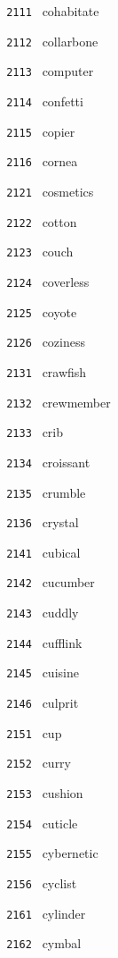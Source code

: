 \documentclass[11pt]{article}
\begin{document}
\begin{multicols}{6}
\small
\noindent \texttt{ 2111 } cohabitate  \par
\noindent \texttt{ 2112 } collarbone  \par
\noindent \texttt{ 2113 } computer  \par
\noindent \texttt{ 2114 } confetti  \par
\noindent \texttt{ 2115 } copier  \par
\noindent \texttt{ 2116 } cornea  \par
\noindent \texttt{ 2121 } cosmetics  \par
\noindent \texttt{ 2122 } cotton  \par
\noindent \texttt{ 2123 } couch  \par
\noindent \texttt{ 2124 } coverless  \par
\noindent \texttt{ 2125 } coyote  \par
\noindent \texttt{ 2126 } coziness  \par
\noindent \texttt{ 2131 } crawfish  \par
\noindent \texttt{ 2132 } crewmember  \par
\noindent \texttt{ 2133 } crib  \par
\noindent \texttt{ 2134 } croissant  \par
\noindent \texttt{ 2135 } crumble  \par
\noindent \texttt{ 2136 } crystal  \par
\noindent \texttt{ 2141 } cubical  \par
\noindent \texttt{ 2142 } cucumber  \par
\noindent \texttt{ 2143 } cuddly  \par
\noindent \texttt{ 2144 } cufflink  \par
\noindent \texttt{ 2145 } cuisine  \par
\noindent \texttt{ 2146 } culprit  \par
\noindent \texttt{ 2151 } cup  \par
\noindent \texttt{ 2152 } curry  \par
\noindent \texttt{ 2153 } cushion  \par
\noindent \texttt{ 2154 } cuticle  \par
\noindent \texttt{ 2155 } cybernetic  \par
\noindent \texttt{ 2156 } cyclist  \par
\noindent \texttt{ 2161 } cylinder  \par
\noindent \texttt{ 2162 } cymbal  \par

\end{multicols}
\end{document}
